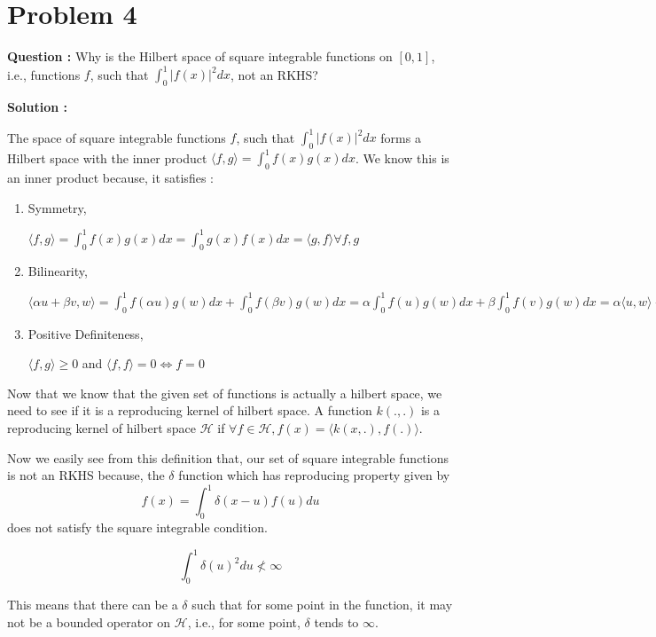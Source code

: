 \documentclass[a4paper, 11pt]{article}
\begin{document}
\section*{Problem 4}

\textbf{Question :} Why  is  the  Hilbert  space  of  square  integrable  functions  on $[0,1]$, i.e., functions $f$, such that $\int_{0}^{1}|f(x)|^2 dx$, not an RKHS?

\textbf{Solution :}

The space of square integrable functions $f$, such that $\int_{0}^{1}|f(x)|^2 dx$ forms a Hilbert space with the inner product $\langle f, g \rangle = \int_{0}^{1} f(x)g(x)dx $. We know this is an inner product because, it satisfies : 

\begin{enumerate}
\item Symmetry,

$\langle f, g \rangle = \int_{0}^{1} f(x)g(x)dx  = \int_{0}^{1} g(x)f(x)dx = \langle g, f \rangle \forall f,g$

\item Bilinearity,

$\langle \alpha u + \beta v, w \rangle = \int_{0}^{1} f(\alpha u)g(w)dx + \int_{0}^{1} f(\beta v)g(w)dx = \alpha\int_{0}^{1} f( u)g(w)dx + \beta\int_{0}^{1} f(v)g(w)dx = \alpha\langle  u, w \rangle + \beta \langle v, w \rangle $

\item Positive Definiteness,

$\langle f, g \rangle \geq 0$ and $\langle f, f \rangle = 0 \iff f = 0$ 

\end{enumerate}

Now that we know that the given set of functions is actually a hilbert space, we need to see if it is a reproducing kernel of hilbert space. A function $k(.,.)$ is a reproducing kernel of hilbert space $\mathcal{H}$ if $\forall f \in \mathcal{H}, f(x) = \langle k(x,.), f(.) \rangle.$

Now we easily see from this definition that, our set of square integrable functions is not an RKHS because, the $\delta$ function which has reproducing property given by $$f(x) = \int_{0}^{1}\delta(x-u)f(u)du$$ does not satisfy the square integrable condition. 

$$ \int_{0}^{1}\delta(u)^{2} du \not< \infty $$ 

This means that there can be a $\delta$ such that for some point in the function, it may not be a bounded operator on $\mathcal{H}$, i.e., for some point, $\delta$ tends to $\infty$. 
\end{document}
